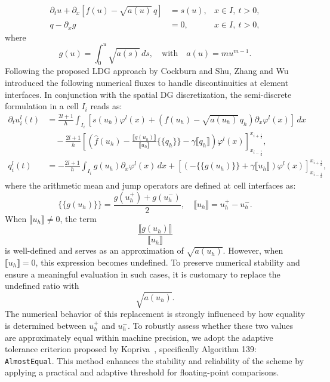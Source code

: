 \documentclass[a4paper,12pt]{paper}
\newcommand{\mean}[1]{\{\!\!\{#1\}\!\!\}}
\begin{document}
\begin{align*}
	\partial_t u + \partial_x\left[f(u) - \sqrt{a(u)}\,q\right] &= s(u), &x \in I,~t > 0, \\
	q - \partial_x g &= 0, &x \in I,~t > 0,
\end{align*}
where
\[
g(u) = \int_0^u \sqrt{a(s)}\,ds, \quad \text{with} \quad a(u) = m u^{m-1}.
\]
Following the proposed LDG approach by Cockburn and Shu, Zhang and Wu~\cite{Zhang2009} introduced the following numerical fluxes to handle discontinuities at element interfaces. In conjunction with the spatial DG discretization, the semi-discrete formulation in a cell \( I_i \) reads as:
\begin{equation}
	\begin{aligned}
		\partial_t u_i^l(t) &= \frac{2l+1}{h} \int_{I_i} \left[ s(u_h) \varphi^l(x) + \left( f(u_h) - \sqrt{a(u_h)}\,q_h \right) \partial_x \varphi^l(x) \right]\,dx \\
		&\quad - \frac{2l+1}{h} \left[ \left( \hat{f}(u_h) - \frac{\llbracket g(u_h) \rrbracket}{\llbracket u_h \rrbracket} \mean{q_h} - \gamma \llbracket q_h \rrbracket \right) \varphi^l(x) \right]_{x_{i-\frac{1}{2}}}^{x_{i+\frac{1}{2}}}, \\
		q_i^l(t) &= -\frac{2l+1}{h} \int_{I_i} g(u_h) \partial_x \varphi^l(x)\,dx + \left[ \left( -\mean{g(u_h)} + \gamma \llbracket u_h \rrbracket \right) \varphi^l(x) \right]_{x_{i-\frac{1}{2}}}^{x_{i+\frac{1}{2}}},
	\end{aligned}
	\label{eq:semidiscreteLDG}
\end{equation}
where the arithmetic mean and jump operators are defined at cell interfaces as:
\[
\mean{g(u_h)} = \frac{g(u_h^+) + g(u_h^-)}{2}, \quad
\llbracket u_h \rrbracket = u_h^+ - u_h^-.
\]
When \( \llbracket u_h \rrbracket \neq 0 \), the term
\begin{equation}
\frac{\llbracket g(u_h) \rrbracket}{\llbracket u_h \rrbracket}
\label{eq:jumpterm}
\end{equation}
is well-defined and serves as an approximation of \( \sqrt{a(u_h)} \). However, when \( \llbracket u_h \rrbracket = 0 \), this expression becomes undefined. To preserve numerical stability and ensure a meaningful evaluation in such cases, it is customary to replace the undefined ratio with
\[
\sqrt{a(u_h)}.
\]
The numerical behavior of this replacement is strongly influenced by how equality is determined between \( u_h^+ \) and \( u_h^- \). To robustly assess whether these two values are approximately equal within machine precision, we adopt the adaptive tolerance criterion proposed by Kopriva~\cite{Kopriva2009}, specifically Algorithm 139: \texttt{AlmostEqual}. This method enhances the stability and reliability of the scheme by applying a practical and adaptive threshold for floating-point comparisons.
\end{document}
